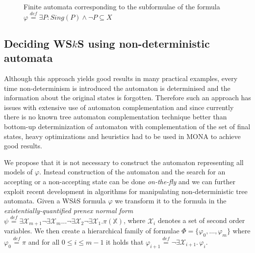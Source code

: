 \documentclass{eeict}
\begin{document}
\begin{figure}
\begin{center}
 \end{center}
 \caption{Finite automata corresponding to the subformulae of the formula
 $\varphi \overset{\mathit{def}}{=} \exists P:
 Sing(P) \wedge\neg P \subseteq X$}\label{example}
\end{figure}

\subsection{Deciding WS$k$S using non-deterministic automata}

Although this approach yields good results in many practical examples, every
time non-determinism is introduced the automaton is determinised and the
information about the original states is forgotten. Therefore such an approach
has issues with extensive use of automaton complementation and since currently
there is no known tree automaton complementation technique better than bottom-up determinization of automaton with complementation of the
set of final states, heavy optimizations and heuristics had to be used in MONA
to achieve good results.

We propose that it is not necessary to construct the automaton representing all
models of $\varphi$. Instead construction of the automaton and the search for an
accepting or a non-accepting state can be done \emph{on-the-fly} and we can further exploit
recent development in algorithms for manipulating non-deterministic
tree automata.
Given a WS$k$S formula $\varphi$ we transform it to the formula in the \emph{existentially-quantified prenex normal form} $\psi \overset{\mathit{def}}{=}
\exists\mathcal{X}_{m+1}\neg\exists\mathcal{X}_m\ldots\neg\exists\mathcal{X}_2\neg\exists\mathcal{X}_1.\pi(\mathds{X})$,
where $\mathcal{X}_i$ denotes a set of second order variables.
We then create a hierarchical family of formulae $\Phi =
\{\varphi_0,\ldots,\varphi_m\}$ where $\varphi_0 \overset{\mathit{def}}{=} \pi$ and for all $0 \leq i \leq
m-1$ it holds that $\varphi_{i+1} \overset{\mathit{def}}{=}
\neg\exists\mathcal{X}_{i+1}.\,\varphi_i$.
\end{document}
